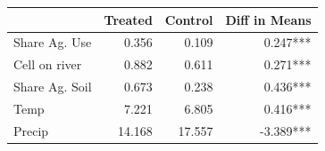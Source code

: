 \begin{table}[!t]
\fontsize{12.0pt}{14.4pt}\selectfont
\begin{tabular*}{\linewidth}{@{\extracolsep{\fill}}lrrr}
\toprule
 & Treated & Control & Diff in Means \\ 
\midrule\addlinespace[2.5pt]
Share Ag. Use & 0.356 & 0.109 & 0.247*** \\ 
Cell on river & 0.882 & 0.611 & 0.271*** \\ 
Share Ag. Soil & 0.673 & 0.238 & 0.436*** \\ 
Temp & 7.221 & 6.805 & 0.416*** \\ 
Precip & 14.168 & 17.557 & -3.389*** \\ 
\bottomrule
\end{tabular*}
\end{table}

